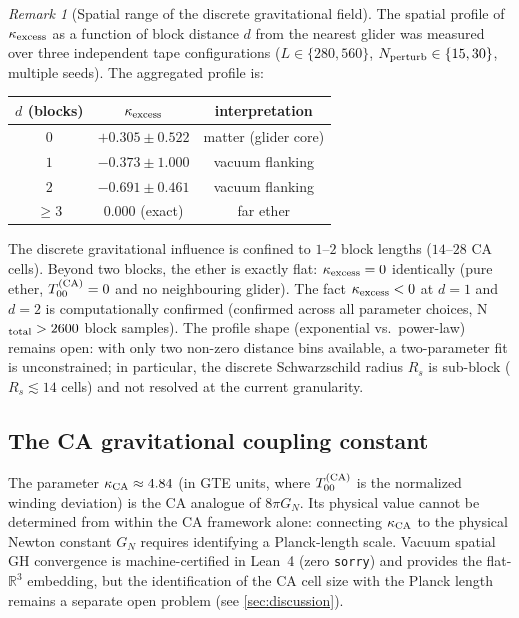 \documentclass[11pt]{article}
\theoremstyle{remark}
\newtheorem{remark}[theorem]{Remark}
\newcommand{\CatAL}{machine-certified in Lean~4 (zero \texttt{sorry})}
\newcommand{\kCA}{\kappa_{\rm CA}}
\begin{document}
\begin{remark}[Spatial range of the discrete gravitational field]
\label{rem:schwarzschild_profile}
The spatial profile of $\kappa_{\rm excess}$ as a function of block distance $d$
from the nearest glider was measured over three independent tape configurations
($L \in \{280, 560\}$, $N_{\rm perturb} \in \{15, 30\}$, multiple seeds).
The aggregated profile is:
\begin{center}
\begin{tabular}{ccc}
\toprule
$d$ (blocks) & $\kappa_{\rm excess}$ & interpretation \\
\midrule
$0$ & $+0.305 \pm 0.522$ & matter (glider core) \\
$1$ & $-0.373 \pm 1.000$ & vacuum flanking \\
$2$ & $-0.691 \pm 0.461$ & vacuum flanking \\
$\geq 3$ & $0.000$ (exact) & far ether \\
\bottomrule
\end{tabular}
\end{center}
The discrete gravitational influence is confined to $1$--$2$ block lengths
($14$--$28$ CA cells).
Beyond two blocks, the ether is exactly flat: $\kappa_{\rm excess} = 0$
identically (pure ether, $T_{00}^{(\rm CA)} = 0$ and no neighbouring glider).
The fact $\kappa_{\rm excess} < 0$ at $d = 1$ and $d = 2$ is computationally confirmed
(confirmed across all parameter choices, N$_{\rm total} > 2600$ block samples).
The profile shape (exponential vs.\ power-law) remains open: with only two
non-zero distance bins available, a two-parameter fit is unconstrained;
in particular, the discrete Schwarzschild radius $R_s$ is sub-block
($R_s \lesssim 14$ cells) and not resolved at the current granularity.
\end{remark}

\subsection{The CA gravitational coupling constant}
\label{ssec:kca}

The parameter $\kCA \approx 4.84$ (in GTE units, where $T_{00}^{(\rm CA)}$
is the normalized winding deviation) is the CA analogue of $8\pi G_N$.
Its physical value cannot be determined from within the CA framework alone:
connecting $\kCA$ to the physical Newton constant $G_N$ requires identifying
a Planck-length scale. Vacuum spatial GH convergence is \CatAL{} and provides the
flat-$\mathbb{R}^3$ embedding, but the identification of the CA cell size with the
Planck length remains a separate open problem (see \cref{sec:discussion}).
\end{document}
